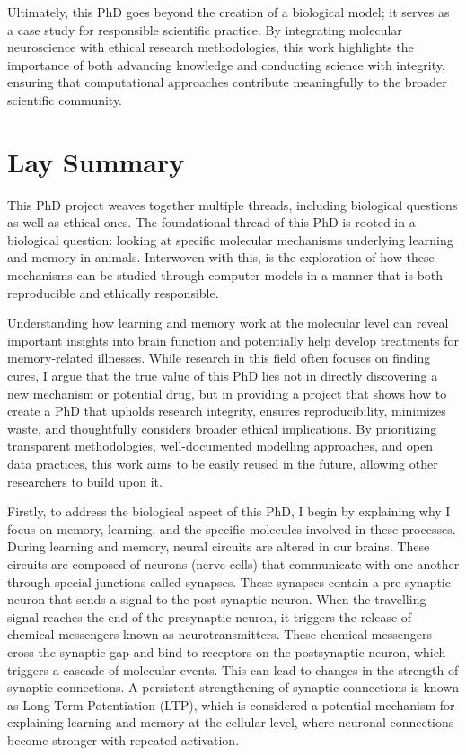 \documentclass[
  11pt,
  letterpaper,
]{scrreprt}
\begin{document}
Ultimately, this PhD goes beyond the creation of a biological model; it
serves as a case study for responsible scientific practice. By
integrating molecular neuroscience with ethical research methodologies,
this work highlights the importance of both advancing knowledge and
conducting science with integrity, ensuring that computational
approaches contribute meaningfully to the broader scientific community.


\chapter*{Lay Summary}\label{lay-summary}


This PhD project weaves together multiple threads, including biological
questions as well as ethical ones. The foundational thread of this PhD
is rooted in a biological question: looking at specific molecular
mechanisms underlying learning and memory in animals. Interwoven with
this, is the exploration of how these mechanisms can be studied through
computer models in a manner that is both reproducible and ethically
responsible.

Understanding how learning and memory work at the molecular level can
reveal important insights into brain function and potentially help
develop treatments for memory-related illnesses. While research in this
field often focuses on finding cures, I argue that the true value of
this PhD lies not in directly discovering a new mechanism or potential
drug, but in providing a project that shows how to create a PhD that
upholds research integrity, ensures reproducibility, minimizes waste,
and thoughtfully considers broader ethical implications. By prioritizing
transparent methodologies, well-documented modelling approaches, and
open data practices, this work aims to be easily reused in the future,
allowing other researchers to build upon it.

Firstly, to address the biological aspect of this PhD, I begin by
explaining why I focus on memory, learning, and the specific molecules
involved in these processes. During learning and memory, neural circuits
are altered in our brains. These circuits are composed of neurons (nerve
cells) that communicate with one another through special junctions
called synapses. These synapses contain a pre-synaptic neuron that sends
a signal to the post-synaptic neuron. When the travelling signal reaches
the end of the presynaptic neuron, it triggers the release of chemical
messengers known as neurotransmitters. These chemical messengers cross
the synaptic gap and bind to receptors on the postsynaptic neuron, which
triggers a cascade of molecular events. This can lead to changes in the
strength of synaptic connections. A persistent strengthening of synaptic
connections is known as Long Term Potentiation (LTP), which is
considered a potential mechanism for explaining learning and memory at
the cellular level, where neuronal connections become stronger with
repeated activation.
\end{document}

